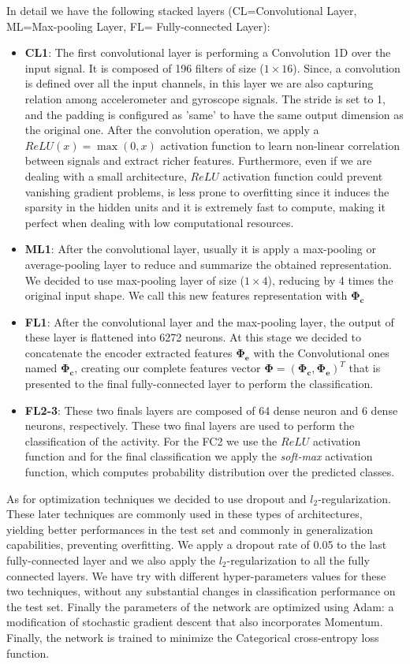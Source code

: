 In detail we have the following stacked layers (CL=Convolutional Layer, ML=Max-pooling Layer, FL= Fully-connected Layer):
\begin{itemize}
	\item \textbf{CL1}: The first convolutional layer is performing a Convolution 1D over the input signal. It is composed of 196 filters of size ($1\times16$). Since, a convolution is defined over all the input channels, in this layer we are also capturing relation among accelerometer and gyroscope signals. The stride is set to 1, and the padding is configured as 'same' to have the same output dimension as the original one. After the convolution operation, we apply a $ReLU(x)=\max(0,x)$ activation function to learn non-linear correlation between signals and extract richer features. Furthermore, even if we are dealing with a small architecture, $ReLU$ activation function could prevent vanishing gradient problems, is less prone to overfitting since it induces the sparsity in the hidden units and it is extremely fast to compute, making it perfect when dealing with low computational resources.
	\item \textbf{ML1}: After the convolutional layer, usually it is apply a max-pooling or average-pooling layer to reduce and summarize the obtained representation. We decided to use max-pooling layer of size ($1\times4$), reducing by 4 times the original input shape. We call this new features representation with $ \boldsymbol{\Phi_{\text{c}} }$
	\item \textbf{FL1}: After the convolutional layer and the max-pooling layer, the output of these layer is flattened into 6272 neurons. At this stage we decided to concatenate the encoder extracted features $ \boldsymbol{\Phi_{\text{e}}} $ with the Convolutional ones named $\boldsymbol{\Phi_{\text{c}}}$, creating our complete features vector $\boldsymbol{\Phi} = (\boldsymbol{\Phi_{\text{c}}}, \boldsymbol{\Phi_{\text{e}}})^T$ that is presented to the final fully-connected layer to perform the classification.
	\item \textbf{FL2-3}: These two finals layers are composed of 64 dense neuron and 6 dense neurons, respectively. These two final layers are used to perform the classification of the activity. For the FC2 we use the $ReLU$ activation function and for the final classification we apply the \textit{soft-max} activation function, which computes probability distribution over the predicted classes.
\end{itemize}

As for optimization techniques we decided to use dropout and $l_2$-regularization. These later techniques are commonly used in these types of architectures, yielding better performances in the test set and commonly in generalization capabilities, preventing overfitting. We apply a dropout rate of 0.05 to the last fully-connected layer and we also apply the $l_2$-regularization to all the fully connected layers. We have try with different hyper-parameters values for these two techniques, without any substantial changes in classification performance on the test set. Finally the parameters of the network are optimized using Adam: a modification of stochastic gradient descent that also incorporates Momentum. Finally, the network is trained to minimize the Categorical cross-entropy loss function.
